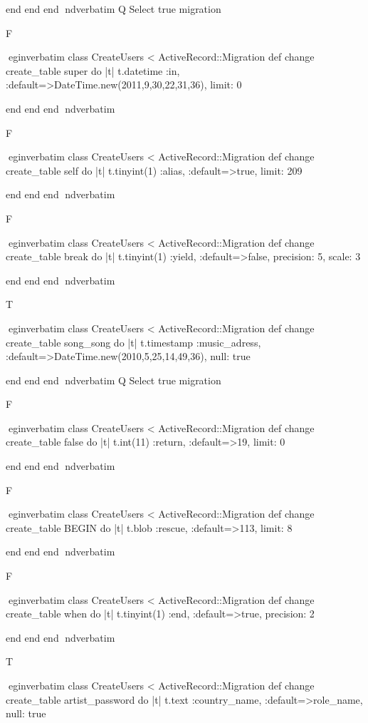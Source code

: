     end 
  end 
end
nd{verbatim}
Q
 Select true migration

F

egin{verbatim}
 class CreateUsers < ActiveRecord::Migration 
  def change 
    create_table super do |t| 
      t.datetime :in, :default=>DateTime.new(2011,9,30,22,31,36), limit: 0
    
    end 
  end 
end
nd{verbatim}

F

egin{verbatim}
 class CreateUsers < ActiveRecord::Migration 
  def change 
    create_table self do |t| 
      t.tinyint(1) :alias, :default=>true, limit: 209
    
    end 
  end 
end
nd{verbatim}

F

egin{verbatim}
 class CreateUsers < ActiveRecord::Migration 
  def change 
    create_table break do |t| 
      t.tinyint(1) :yield, :default=>false, precision: 5, scale: 3
    
    end 
  end 
end
nd{verbatim}

T

egin{verbatim}
 class CreateUsers < ActiveRecord::Migration 
  def change 
    create_table song_song do |t| 
      t.timestamp :music_adress, :default=>DateTime.new(2010,5,25,14,49,36), null: true
    
    end 
  end 
end
nd{verbatim}
Q
 Select true migration

F

egin{verbatim}
 class CreateUsers < ActiveRecord::Migration 
  def change 
    create_table false do |t| 
      t.int(11) :return, :default=>19, limit: 0
    
    end 
  end 
end
nd{verbatim}

F

egin{verbatim}
 class CreateUsers < ActiveRecord::Migration 
  def change 
    create_table BEGIN do |t| 
      t.blob :rescue, :default=>113, limit: 8
    
    end 
  end 
end
nd{verbatim}

F

egin{verbatim}
 class CreateUsers < ActiveRecord::Migration 
  def change 
    create_table when do |t| 
      t.tinyint(1) :end, :default=>true, precision: 2
    
    end 
  end 
end
nd{verbatim}

T

egin{verbatim}
 class CreateUsers < ActiveRecord::Migration 
  def change 
    create_table artist_password do |t| 
      t.text :country_name, :default=>role_name, null: true
    
